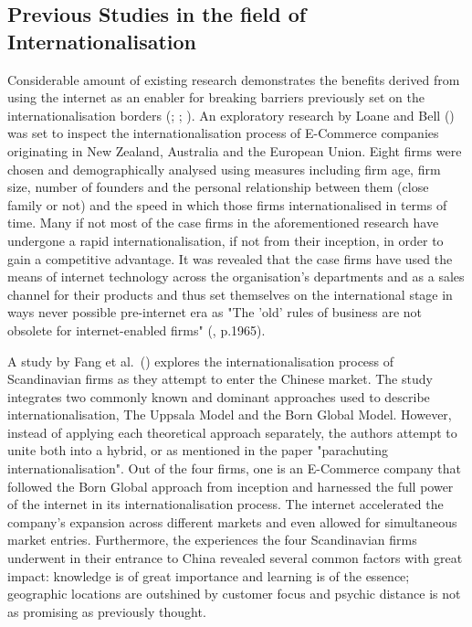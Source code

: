 \documentclass[12pt,a4paper]{article}
\begin{document}
\subsection{Previous Studies in the field of Internationalisation}
  \vspace{-5mm}
Considerable amount of existing research demonstrates the benefits derived from using the internet as an enabler for breaking barriers previously set on the internationalisation borders (\cite{chaiAncientModernCross2004}; \cite{shneorInternetenabledInternationalizationProcess2008}; \cite{areniusRapidInternationalisationEnabled2005}). %
An exploratory research by Loane and Bell (\citeyear{loaneCrossnationalComparisonInternationalisation2002}) was set to inspect the internationalisation process of E-Commerce companies originating in New Zealand, Australia and the European Union. Eight firms were chosen and demographically analysed using measures including firm age, firm size, number of founders and the personal relationship between them (close family or not) and the speed in which those firms internationalised in terms of time. Many if not most of the case firms in the aforementioned research have undergone a rapid internationalisation, if not from their inception, in order to gain a competitive advantage. It was revealed that the case firms have used the means of internet technology across the organisation's departments and as a sales channel for their products and thus set themselves on the international stage in ways never possible pre-internet era as "The 'old' rules of business are not obsolete for internet-enabled firms" (\cite{loaneCrossnationalComparisonInternationalisation2002}, p.1965).   \par 
A study by Fang et al.\ (\citeyear{fangParachutingInternationalizationStudy2017}) explores the internationalisation process of Scandinavian firms as they attempt to enter the Chinese market. The study integrates two commonly known and dominant approaches used to describe internationalisation, The Uppsala Model and the Born Global Model. However, instead of applying each theoretical approach separately, the authors attempt to unite both into a hybrid, or as mentioned in the paper "parachuting internationalisation". Out of the four firms, one is an E-Commerce company that followed the Born Global approach from inception and harnessed the full power of the internet in its internationalisation process. The internet accelerated the company's expansion across different markets and even allowed for simultaneous market entries. Furthermore, the experiences the four Scandinavian firms underwent in their entrance to China revealed several common factors with great impact: knowledge is of great importance and learning is of the essence; geographic locations are outshined by customer focus and psychic distance is not as promising as previously thought. \par
\end{document}
